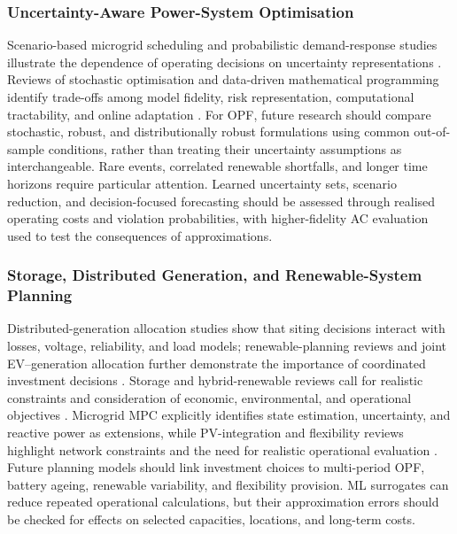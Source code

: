 \documentclass[a4paper,fleqn]{cas-sc}
\begin{document}
\subsubsection{Uncertainty-Aware Power-System Optimisation}\label{subsubsec:gaps_uncertainty}

Scenario-based microgrid scheduling and probabilistic demand-response studies illustrate the dependence of operating decisions on uncertainty representations \cite{opfRef018,opfRef036}. Reviews of stochastic optimisation and data-driven mathematical programming identify trade-offs among model fidelity, risk representation, computational tractability, and online adaptation \cite{opfRef076,opfRef059,roald2023power}. For OPF, future research should compare stochastic, robust, and distributionally robust formulations using common out-of-sample conditions, rather than treating their uncertainty assumptions as interchangeable. Rare events, correlated renewable shortfalls, and longer time horizons require particular attention. Learned uncertainty sets, scenario reduction, and decision-focused forecasting should be assessed through realised operating costs and violation probabilities, with higher-fidelity AC evaluation used to test the consequences of approximations.

\subsubsection{Storage, Distributed Generation, and Renewable-System Planning}\label{subsubsec:gaps_storage_planning}

Distributed-generation allocation studies show that siting decisions interact with losses, voltage, reliability, and load models; renewable-planning reviews and joint EV--generation allocation further demonstrate the importance of coordinated investment decisions \cite{opfRef009,opfRef013,opfRef021,opfRef038,opfRef040}. Storage and hybrid-renewable reviews call for realistic constraints and consideration of economic, environmental, and operational objectives \cite{opfRef079,opfRef083,worku2022recent,thirunavukkarasu2023comprehensive}. Microgrid MPC explicitly identifies state estimation, uncertainty, and reactive power as extensions, while PV-integration and flexibility reviews highlight network constraints and the need for realistic operational evaluation \cite{opfRef022,shafiullah2022grid,opfRef034}. Future planning models should link investment choices to multi-period OPF, battery ageing, renewable variability, and flexibility provision. ML surrogates can reduce repeated operational calculations, but their approximation errors should be checked for effects on selected capacities, locations, and long-term costs.
\end{document}
